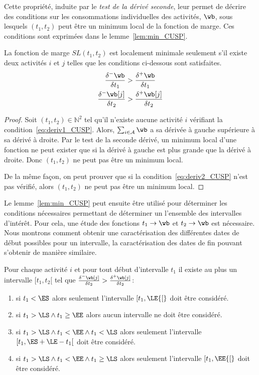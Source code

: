 Cette propriété, induite par le {\it test de la dérivé seconde}, leur
permet de décrire des conditions sur les consommations individuelles
des activités, $\wb$, sous lesquels $(t_1,t_2)$ peut être un minimum
local de la fonction de marge. Ces conditions sont exprimées dans le
lemme~\ref{lem:min_CUSP}. 

\begin{lemma}
\label{lem:min_CUSP}
La fonction de marge $SL(t_1,t_2)$ est localement minimale seulement
s'il existe deux activités $i$ et $j$ telles que les conditions
ci-dessous sont satisfaites. 
\begin{align} \frac{\delta^{-}\wb}{\delta t_1} &>
\frac{\delta^{+}\wb}{\delta t_1} \label{eq:deriv1_CUSP}\\ 
\frac{\delta^{-}\wb[j]}{\delta t_2}
& > \frac{\delta^{+}\wb[j]}{\delta t_2} \label{eq:deriv2_CUSP}
\end{align}
\end{lemma}

\begin{proof}
Soit $(t_1,t_2) \in \mathbb{N}^2$ tel qu'il n'existe aucune activité
$i$ vérifiant la condition~\eqref{eq:deriv1_CUSP}. Alors, $\sum_{i \in
  \A} \wb$ a sa dérivée à gauche supérieure à sa dérivé à droite. Par
le test de la seconde dérivé, un minimum local d'une fonction ne peut
exister que si la dérivé à gauche est plus grande que la dérivé à
droite. Donc $(t_1,t_2)$ ne peut pas être un minimum local. 

De la même façon, on peut prouver que si la
condition~\eqref{eq:deriv2_CUSP} n'est pas vérifié, alors $(t_1,t_2)$
ne peut pas être un minimum local. 
\end{proof}

Le lemme~\ref{lem:min_CUSP} peut ensuite être utilisé pour déterminer
les conditions nécessaires permettant de déterminer un l'ensemble des
intervalles d'intérêt. Pour cela, une étude des fonctions $t_1
\rightarrow \wb$ et $t_2 \rightarrow \wb$ est nécessaire. Nous montrons
comment obtenir une caractérisation des différentes dates de début
possibles pour un intervalle, la caractérisation des dates de fin
pouvant s'obtenir de manière similaire.

\begin{lemma}
  Pour chaque activité $i$ et pour tout début d'intervalle $t_1$ il
  existe au plus un intervalle $[t_1,t_2[$ tel que
  $\frac{\delta^{-}\wb[j]}{\delta t_2} >
  \frac{\delta^{+}\wb[j]}{\delta t_2} $:
  \begin{enumerate}
  \item si $t_1 < \ES$ alors seulement l'intervalle $[t_1,\LE {[}$ doit
    être considéré.
  \item si $t_1  > \LS \land t_1 \ge \EE$ alors aucun intervalle ne
    doit être considéré. 
  \item si $t_1  > \LS \land t_1 <\EE \land t_1 < \LS$ alors seulement
    l'intervalle $[t_1,\ES+\LE-t_1 [$ doit
    être considéré.
  \item si $t_1  > \LS \land t_1 <\EE \land t_1 \ge \LS$ alors
    seulement l'intervalle $[t_1,\EE {[}$ doit
    être considéré.
  \end{enumerate}
\end{lemma}

